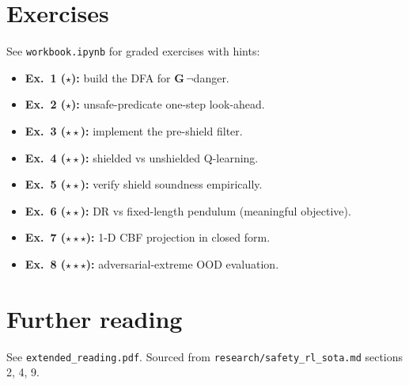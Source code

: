 \documentclass[11pt,oneside]{scrbook}
\begin{document}
\chapter{Exercises}
See \texttt{workbook.ipynb} for graded exercises with hints:
\begin{itemize}[leftmargin=*]
  \item \textbf{Ex.\ 1 ($\star$):} build the DFA for $\mathbf{G}\,\neg$danger.
  \item \textbf{Ex.\ 2 ($\star$):} unsafe-predicate one-step look-ahead.
  \item \textbf{Ex.\ 3 ($\star\star$):} implement the pre-shield filter.
  \item \textbf{Ex.\ 4 ($\star\star$):} shielded vs unshielded Q-learning.
  \item \textbf{Ex.\ 5 ($\star\star$):} verify shield soundness empirically.
  \item \textbf{Ex.\ 6 ($\star\star$):} DR vs fixed-length pendulum (meaningful objective).
  \item \textbf{Ex.\ 7 ($\star\star\star$):} 1-D CBF projection in closed form.
  \item \textbf{Ex.\ 8 ($\star\star\star$):} adversarial-extreme OOD evaluation.
\end{itemize}

\chapter{Further reading}
See \texttt{extended\_reading.pdf}. Sourced from
\texttt{research/safety\_rl\_sota.md} sections 2, 4, 9.
\end{document}
